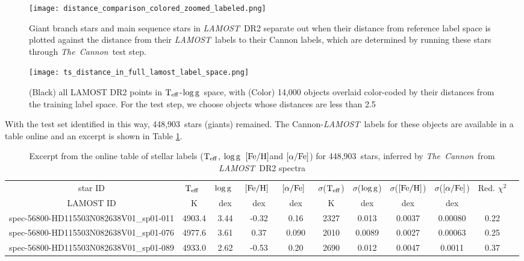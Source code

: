 \documentclass[12pt, preprint]{aastex}
\newcommand{\tc}{\textsl{The~Cannon}}
\newcommand{\lamost}{\textsl{LAMOST}}
\newcommand{\teff}{\mbox{$\rm T_{eff}$}}
\newcommand{\feh}{\mbox{$\rm [Fe/H]$}}
\newcommand{\alphafe}{\mbox{$\rm [\alpha/Fe]$}}
\newcommand{\logg}{\mbox{$\rm \log g$}}
\newcommand{\ntestobj}{448,903}
\begin{document}
\begin{figure}[h!]
\centering
\texttt{[image: distance\_comparison\_colored\_zoomed\_labeled.png]}
\caption{Giant branch stars and main sequence stars in \lamost\ DR2 separate out when their distance from reference label space is plotted against the distance from their \lamost\ labels to their Cannon labels, which are determined by running these stars through \tc\ test step.}
\label{fig:ts-dist}
\end{figure}

\begin{figure}[h!]
\centering
\texttt{[image: ts\_distance\_in\_full\_lamost\_label\_space.png]}
\caption{(Black) all LAMOST DR2 points in \teff-\logg\ space, with (Color) 14,000 objects overlaid color-coded by their distances from the training label space. For the test step, we choose objects whose distances are less than 2.5}
\label{fig:ts-dist-dr2}
\end{figure}

With the test set identified in this way, \ntestobj\ stars (giants) remained. The Cannon-\lamost\ 
labels for these objects are available in a table online and an excerpt is shown in Table \ref{tab:results}. 

\begin{table*}[!h]
\tiny{
\centering
\caption{Excerpt from the online table of stellar labels (\teff, \logg\, \feh and \alphafe) for 
\ntestobj\ stars, inferred by \tc\ from \lamost\ DR2 spectra} 
\begin{tabular}{| c | c | c |  c | c | c |  c | c | c | c | c | } 
\hline
\tiny{star ID}  & \teff\ & \logg\ & \feh\ & \alphafe\ & $\sigma$(\teff) & $\sigma$(\logg) & $\sigma$(\feh) & $\sigma$(\alphafe) & Red. $\chi^2$ \\
\tiny{LAMOST ID} & K & dex & dex & dex & K & dex & dex & dex &\\    
\hline
\tiny{spec-56800-HD115503N082638V01\_sp01-011} & 4903.4 & 3.44  & -0.32  & 0.16 & 2327 & 0.013 & 0.0037 & 0.00080 & 0.22 \\
\tiny{spec-56800-HD115503N082638V01\_sp01-076} & 4977.6  & 3.61  & 0.37  & 0.090 & 2010 & 0.0089 & 0.0027 & 0.00063 & 0.25 \\
\tiny{spec-56800-HD115503N082638V01\_sp01-089} & 4933.0  & 2.62  & -0.53 &  0.20 & 2690 & 0.012 & 0.0047 & 0.0011 & 0.37 \\
\hline
\end{tabular}
\label{tab:results} }
\end{table*}  
\end{document}
